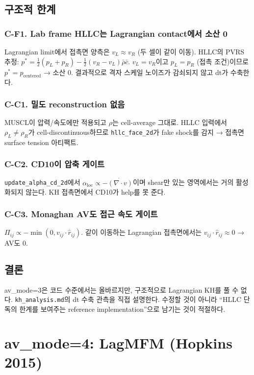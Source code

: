 \documentclass[11pt]{article}
\begin{document}
\subsection{구조적 한계}

\subsubsection*{C-F1. Lab frame HLLC는 Lagrangian contact에서 소산 0}
Lagrangian limit에서 접촉면 양측은 $v_L \approx v_R$ (두 셀이 같이 이동).
HLLC의 PVRS 추정: $p^* = \tfrac{1}{2}(p_L+p_R) - \tfrac{1}{2}(v_R-v_L)\bar\rho\bar c$.
$v_L = v_R$이고 $p_L = p_R$ (접촉 조건)이므로 $p^* = p_\mathrm{centered}$ → 소산 0.
결과적으로 격자 스케일 노이즈가 감쇠되지 않고 dt가 수축한다.

\subsubsection*{C-C1. 밀도 reconstruction 없음}
MUSCL이 압력/속도에만 적용되고 $\rho$는 cell-average 그대로.
HLLC 입력에서 $\rho_L \ne \rho_R$가 cell-discontinuous하므로
\texttt{hllc\_face\_2d}가 fake shock를 감지 → 접촉면 surface tension 아티팩트.

\subsubsection*{C-C2. CD10이 압축 게이트}
\texttt{update\_alpha\_cd\_2d}에서 $\alpha_\mathrm{loc} \propto -\dot{(\nabla\cdot v)}$이며
shear만 있는 영역에서는 거의 활성화되지 않는다. KH 접촉면에서 CD10가 help를 못 준다.

\subsubsection*{C-C3. Monaghan AV도 접근 속도 게이트}
$\Pi_{ij} \propto -\min(0, v_{ij}\cdot\hat r_{ij})$.
같이 이동하는 Lagrangian 접촉면에서는 $v_{ij}\cdot\hat r_{ij} \approx 0$ → AV도 0.

\subsection{결론}
av\_mode=3은 코드 수준에서는 올바르지만, 구조적으로 Lagrangian KH를 풀 수 없다.
\texttt{kh\_analysis.md}의 dt 수축 관측을 직접 설명한다. 수정할 것이 아니라
``HLLC 단독의 한계를 보여주는 reference implementation''으로 남기는 것이 적절하다.


\section{av\_mode=4: LagMFM (Hopkins 2015)}
\end{document}
